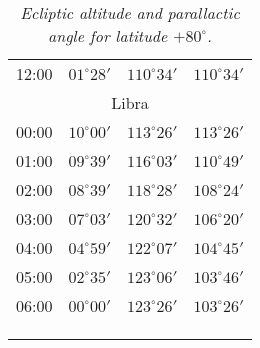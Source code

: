 \begin{table}
\begin{Parallel}{}{}
{{\begin{tabular}{l|lll}
12:00 & $01^\circ 28'$ & $110^\circ 34'$& $110^\circ 34'$ \\
\multicolumn{4}{c}{Libra}\\
00:00 & $10^\circ 00'$ & $113^\circ 26'$& $113^\circ 26'$ \\
01:00 & $09^\circ 39'$ & $116^\circ 03'$& $110^\circ 49'$ \\
02:00 & $08^\circ 39'$ & $118^\circ 28'$& $108^\circ 24'$ \\
03:00 & $07^\circ 03'$ & $120^\circ 32'$& $106^\circ 20'$ \\
04:00 & $04^\circ 59'$ & $122^\circ 07'$& $104^\circ 45'$ \\
05:00 & $02^\circ 35'$ & $123^\circ 06'$& $103^\circ 46'$ \\
06:00 & $00^\circ 00'$ & $123^\circ 26'$& $103^\circ 26'$ \\
\multicolumn{4}{c}{}\\
\multicolumn{4}{c}{}\\
\multicolumn{4}{c}{}\\
\end{tabular}
}}
\end{Parallel}
\caption{\em Ecliptic altitude and parallactic angle for latitude $+80^\circ$.}\label{ltyy}
\end{table}
